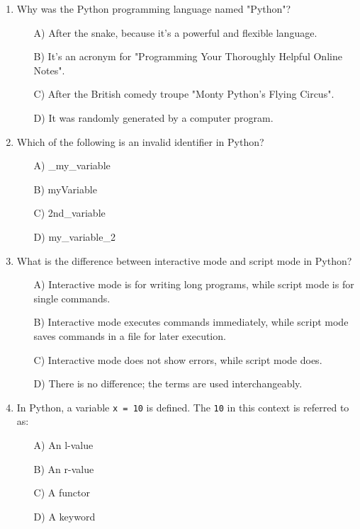\documentclass[9pt]{article}
\begin{document}
\begin{multicols}{2}
\begin{enumerate}
\item Why was the Python programming language named "Python"?
\begin{enumerate}
    \item[A)] After the snake, because it's a powerful and flexible language.
    \item[B)] It's an acronym for "Programming Your Thoroughly Helpful Online Notes".
    \item[C)] After the British comedy troupe "Monty Python's Flying Circus".
    \item[D)] It was randomly generated by a computer program.
\end{enumerate}

\item Which of the following is an invalid identifier in Python?
\begin{enumerate}
    \item[A)] \_my\_variable
    \item[B)] myVariable
    \item[C)] 2nd\_variable
    \item[D)] my\_variable\_2
\end{enumerate}

\item What is the difference between interactive mode and script mode in Python?
\begin{enumerate}
    \item[A)] Interactive mode is for writing long programs, while script mode is for single commands.
    \item[B)] Interactive mode executes commands immediately, while script mode saves commands in a file for later execution.
    \item[C)] Interactive mode does not show errors, while script mode does.
    \item[D)] There is no difference; the terms are used interchangeably.
\end{enumerate}

\item In Python, a variable \texttt{x = 10} is defined. The \texttt{10} in this context is referred to as:
\begin{enumerate}
    \item[A)] An l-value
    \item[B)] An r-value
    \item[C)] A functor
    \item[D)] A keyword
\end{enumerate}


\end{enumerate}
\end{multicols}
\end{document}
